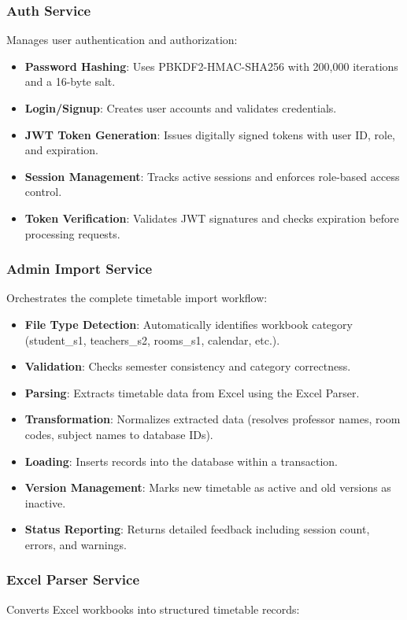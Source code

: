 \subsubsection{Auth Service}
Manages user authentication and authorization:

\begin{itemize}
    \item \textbf{Password Hashing}: Uses PBKDF2-HMAC-SHA256 with 200,000 iterations and a 16-byte salt.
    \item \textbf{Login/Signup}: Creates user accounts and validates credentials.
    \item \textbf{JWT Token Generation}: Issues digitally signed tokens with user ID, role, and expiration.
    \item \textbf{Session Management}: Tracks active sessions and enforces role-based access control.
    \item \textbf{Token Verification}: Validates JWT signatures and checks expiration before processing requests.
\end{itemize}

\subsubsection{Admin Import Service}
Orchestrates the complete timetable import workflow:

\begin{itemize}
    \item \textbf{File Type Detection}: Automatically identifies workbook category (student\_s1, teachers\_s2, rooms\_s1, calendar, etc.).
    \item \textbf{Validation}: Checks semester consistency and category correctness.
    \item \textbf{Parsing}: Extracts timetable data from Excel using the Excel Parser.
    \item \textbf{Transformation}: Normalizes extracted data (resolves professor names, room codes, subject names to database IDs).
    \item \textbf{Loading}: Inserts records into the database within a transaction.
    \item \textbf{Version Management}: Marks new timetable as active and old versions as inactive.
    \item \textbf{Status Reporting}: Returns detailed feedback including session count, errors, and warnings.
\end{itemize}

\subsubsection{Excel Parser Service}
Converts Excel workbooks into structured timetable records:

